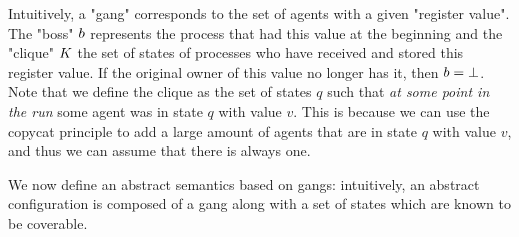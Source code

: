 Intuitively, a "gang" corresponds to the set of agents with a given "register value". The "boss" $\boss$ represents the process that had this value at the beginning and the "clique" $\clique$ the set of states of processes who have received and stored this register value. If the original owner of this value no longer has it, then $\boss = \noboss$. Note that we define the clique as the set of states $q$ such that \emph{at some point in the run} some agent was in state $q$ with value $v$. This is because we can use the copycat principle to add a large amount of agents that are in state $q$ with value $v$, and thus we can assume that there is always one.

We now define an abstract semantics based on gangs: intuitively, an abstract configuration is composed of a gang along with a set of states which are known to be coverable.

